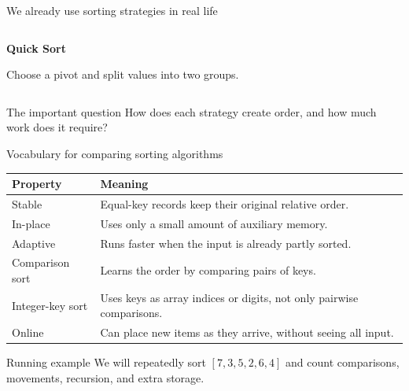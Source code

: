 \documentclass[aspectratio=169]{beamer}
\begin{document}
\begin{frame}{We already use sorting strategies in real life}
\begin{columns}[T,onlytextwidth]
\begin{column}{0.235\textwidth}

\vspace{0.15em}

\textbf{Quick Sort}

\vspace{0.1em}

\scriptsize
Choose a pivot and split values into two groups.

\end{column}

\end{columns}

\vspace{0.35em}

\begin{alertblock}{The important question}
\centering
How does each strategy create order, and how much work does it require?
\end{alertblock}

\end{frame}

\begin{frame}{Vocabulary for comparing sorting algorithms}
  \small
  \begin{center}
    \begin{tabular}{L{0.18\textwidth}L{0.70\textwidth}}
      \toprule
      \textbf{Property} & \textbf{Meaning} \\
      \midrule
      Stable & Equal-key records keep their original relative order. \\
      In-place & Uses only a small amount of auxiliary memory. \\
      Adaptive & Runs faster when the input is already partly sorted. \\
      Comparison sort & Learns the order by comparing pairs of keys. \\
      Integer-key sort & Uses keys as array indices or digits, not only pairwise comparisons. \\
      Online & Can place new items as they arrive, without seeing all input. \\
      \bottomrule
    \end{tabular}
  \end{center}
  \begin{alertblock}{Running example}
    We will repeatedly sort $[7,3,5,2,6,4]$ and count comparisons, movements,
    recursion, and extra storage.
  \end{alertblock}
\end{frame}
\end{document}
